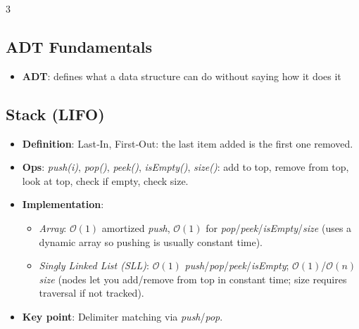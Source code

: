 \documentclass[6pt,landscape]{article}
\newcommand{\bigO}[1]{\ensuremath{\mathcal{O}(#1)}}
\newcommand{\keyword}[1]{\textbf{\textcolor{keywordcolor}{#1}}}
\newcommand{\op}[1]{\textit{\textcolor{opcolor}{#1}}}
\begin{document}
\begin{multicols}{3}
\subsection{ADT Fundamentals}\label{sec:adtfund}
\begin{itemize}
  \item \keyword{ADT}: defines what a data structure can do without saying how it does it
\end{itemize}

\subsection{Stack (LIFO)}\label{sec:stack}
\begin{itemize}
  \item \keyword{Definition}: Last‐In, First‐Out: the last item added is the first one removed.
  \item \textbf{Ops}: \op{push(i)}, \op{pop()}, \op{peek()}, \op{isEmpty()}, \op{size()}: add to top, remove from top, look at top, check if empty, check size.
  \item \textbf{Implementation}:
    \begin{itemize}
      \item \emph{Array}: \bigO{1} amortized \op{push}, \bigO{1} for \op{pop}/\op{peek}/\op{isEmpty}/\op{size} (uses a dynamic array so pushing is usually constant time).
      \item \emph{Singly Linked List (SLL)}: \bigO{1} \op{push}/\op{pop}/\op{peek}/\op{isEmpty}; \bigO{1}/\bigO{n} \op{size} (nodes let you add/remove from top in constant time; size requires traversal if not tracked).
    \end{itemize}
  \item \textbf{Key point}: Delimiter matching via \op{push}/\op{pop}.
\end{itemize}


\end{multicols}
\end{document}

